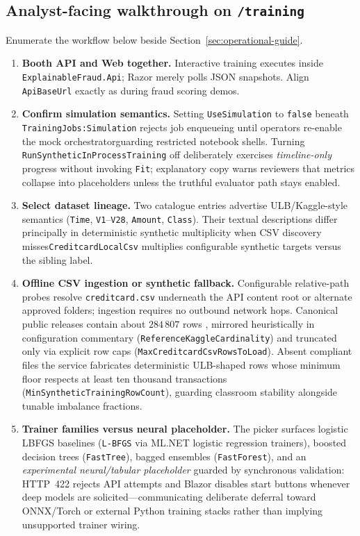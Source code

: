 \subsection{Analyst-facing walkthrough on \texttt{/training}}
Enumerate the workflow below beside Section~\ref{sec:operational-guide}.
\begin{enumerate}
    \item \textbf{Booth API and Web together.} Interactive training executes inside \texttt{Explainable\allowbreak Fraud.Api}; Razor merely polls JSON snapshots. Align \texttt{ApiBaseUrl} exactly as during fraud scoring demos.
    \item \textbf{Confirm simulation semantics.} Setting \texttt{UseSimulation} to \texttt{false} beneath \texttt{TrainingJobs:\allowbreak Simulation} rejects job enqueueing until operators re-enable the mock orchestrator\textemdash guarding restricted notebook shells. Turning \texttt{RunSynthetic\allowbreak InProcessTraining} off deliberately exercises \emph{timeline-only} progress without invoking \texttt{Fit}; explanatory copy warns reviewers that metrics collapse into placeholders unless the truthful evaluator path stays enabled.
    \item \textbf{Select dataset lineage.} Two catalogue entries advertise ULB/\allowbreak Kaggle-style semantics (\texttt{Time}, \texttt{V1}--\texttt{V28}, \texttt{Amount}, \texttt{Class}). Their textual descriptions differ principally in deterministic synthetic multiplicity when CSV discovery misses\textemdash \texttt{Creditcard\allowbreak LocalCsv} multiplies configurable synthetic targets versus the sibling label.
    \item \textbf{Offline CSV ingestion or synthetic fallback.} Configurable relative-path probes resolve \texttt{creditcard.csv} underneath the API content root or alternate approved folders; ingestion requires no outbound network hops. Canonical public releases contain about $284\,807$ rows \cite{credit_card_dataset}, mirrored heuristically in configuration commentary (\texttt{Reference\allowbreak Kaggle\allowbreak Cardinality}) and truncated only via explicit row caps (\texttt{MaxCreditcardCsv\allowbreak RowsToLoad}). Absent compliant files the service fabricates deterministic ULB-shaped rows whose minimum floor respects at least ten thousand transactions (\texttt{MinSyntheticTraining\allowbreak RowCount}), guarding classroom stability alongside tunable imbalance fractions.
    \item \textbf{Trainer families versus neural placeholder.} The picker surfaces logistic LBFGS baselines (\texttt{L-BFGS} via ML.NET logistic regression trainers), boosted decision trees (\texttt{FastTree}), bagged ensembles (\texttt{FastForest}), and an \emph{experimental neural/tabular placeholder} guarded by synchronous validation: HTTP~422 rejects API attempts and Blazor disables start buttons whenever deep models are solicited---communicating deliberate deferral toward ONNX/\allowbreak Torch or external Python training stacks rather than implying unsupported trainer wiring.

\end{enumerate}

